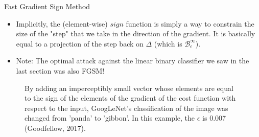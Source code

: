 \begin{vbframe} {Fast Gradient Sign Method}
\begin{itemize}
\begin{figure}
      \caption{$\deltab$ is obtained by setting each element of $\nabla_{\xv} L\left(y, \fh(\xv | \thetab) \right)$ to $-\epsilon$ or $\epsilon$ depending on its sign. Note that this slightly changes the direction of the step that is taken (Kolter \& Madry, 2019).}
  \end{figure}
        \item Implicitly, the (element-wise) $sign$ function is simply a way to constrain the size of the "step" that we take in the direction of the gradient. It is basically equal to a projection of the step back on $\Delta$ (which is $\mathcal{B}^{\infty}_{\epsilon}$).
        \end{itemize}
      \framebreak
        \begin{itemize}
           \item Note: The optimal attack against the linear binary classifier we saw in the last section was also FGSM!
            \end{itemize}
  \begin{figure}
    \centering
      \caption{\small{By adding an imperceptibly small vector whose elements are equal to the sign of the elements of the gradient of the cost function with respect to the input, GoogLeNet's classification of the image was changed from 'panda' to 'gibbon'. In this example, the $\epsilon$ is 0.007 (Goodfellow, 2017).}}
  \end{figure}
\end{vbframe}


